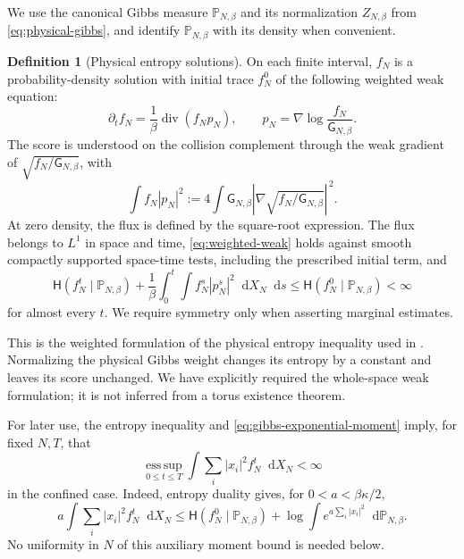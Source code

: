 \documentclass[11pt,reqno]{amsart}
\numberwithin{equation}{section}
\theoremstyle{definition}
\newtheorem{definition}[definition]{Definition}
\theoremstyle{remark}
\newcommand{\Hr}{\mathsf H}
\newcommand{\Pb}{\mathbb P}
\newcommand{\G}{\mathsf G}
\newcommand{\diver}{\operatorname{div}}
\newcommand{\esssup}{\operatorname*{ess\,sup}}
\newcommand{\dd}{\mathop{}\!\mathrm d}
\newcommand{\abs}[1]{\left\lvert#1\right\rvert}
\begin{document}
We use the canonical Gibbs measure $\Pb_{N,\beta}$ and its normalization $Z_{N,\beta}$ from \eqref{eq:physical-gibbs}, and identify $\Pb_{N,\beta}$ with its density when convenient.

\begin{definition}[Physical entropy solutions]\label{def:entropy-solution}
On each finite interval, $f_N$ is a probability-density solution with initial trace $f_N^0$ of the following weighted weak equation:
\begin{equation}\label{eq:weighted-weak}
 \partial_t f_N=\frac1\beta\diver(f_N p_N),\qquad
 p_N=\nabla\log\frac{f_N}{\G_{N,\beta}}.
\end{equation}
The score is understood on the collision complement through the weak gradient of $\sqrt{f_N/\G_{N,\beta}}$, with
\begin{equation}\label{eq:physical-fisher}
 \int f_N|p_N|^2
 :=4\int \G_{N,\beta}\abs{\nabla\sqrt{f_N/\G_{N,\beta}}}^{\,2}.
\end{equation}
At zero density, the flux is defined by the square-root expression. The flux belongs to $L^1$ in space and time, \eqref{eq:weighted-weak} holds against smooth compactly supported space-time tests, including the prescribed initial term, and
\begin{equation}\label{eq:physical-entropy}
 \Hr(f_N^t\mid\Pb_{N,\beta})+\frac1\beta
 \int_0^t\int f_N^s|p_N^s|^2\dd X_N\dd s
 \leq \Hr(f_N^0\mid\Pb_{N,\beta})<\infty
\end{equation}
for almost every $t$. We require symmetry only when asserting marginal estimates.
\end{definition}

This is the weighted formulation of the physical entropy inequality used in \cite[Definition~2.1 and Section~2.5]{BJW}. Normalizing the physical Gibbs weight changes its entropy by a constant and leaves its score unchanged. We have explicitly required the whole-space weak formulation; it is not inferred from a torus existence theorem.

For later use, the entropy inequality and \eqref{eq:gibbs-exponential-moment} imply, for fixed $N,T$, that
\begin{equation}\label{eq:particle-moments}
 \esssup_{0\leq t\leq T}\int\sum_i|x_i|^2 f_N^t\dd X_N<\infty
\end{equation}
in the confined case. Indeed, entropy duality gives, for $0<a<\beta\kappa/2$,
\begin{equation}\label{eq:moment-entropy}
 a\int\sum_i|x_i|^2 f_N^t\dd X_N
 \leq \Hr(f_N^0\mid\Pb_{N,\beta})+
       \log\int e^{a\sum_i|x_i|^2}\dd\Pb_{N,\beta}.
\end{equation}
No uniformity in $N$ of this auxiliary moment bound is needed below.
\end{document}
